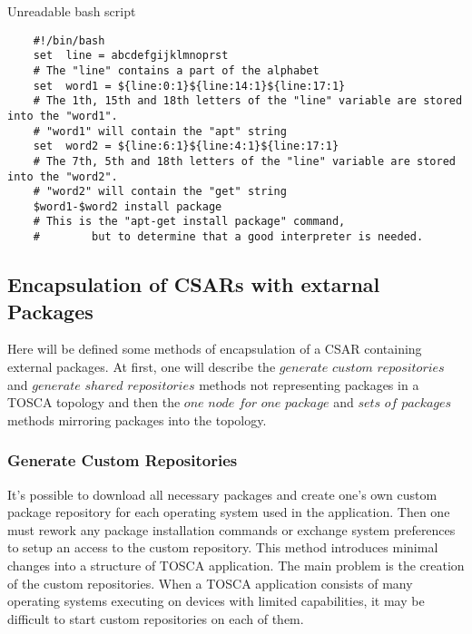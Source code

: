 \begin{Listing} 
	\caption{Unreadable bash script}
	\label{alg:unreadable}
	\begin{lstlisting}
	#!/bin/bash
	set  line = abcdefgijklmnoprst
	# The "line" contains a part of the alphabet
	set  word1 = ${line:0:1}${line:14:1}${line:17:1} 
	# The 1th, 15th and 18th letters of the "line" variable are stored into the "word1".
	# "word1" will contain the "apt" string 
	set  word2 = ${line:6:1}${line:4:1}${line:17:1}
	# The 7th, 5th and 18th letters of the "line" variable are stored into the "word2".
	# "word2" will contain the "get" string 
	$word1-$word2 install package
	# This is the "apt-get install package" command,
	#		 but to determine that a good interpreter is needed.
	\end{lstlisting}
\end{Listing}

\subsection*{Encapsulation of CSARs with extarnal Packages}\label{subs:encaps}
Here will be defined some methods of encapsulation of a CSAR containing external packages.
At first, one will describe the $generate$ $custom$ $repositories$ and $generate$ $shared$ $repositories$ methods not representing packages in a TOSCA topology and then the $one$ $node$ $for$ $one$ $package$ and $sets$ $of$ $packages$ methods mirroring packages into the topology.
\subsubsection*{Generate Custom Repositories}
It's possible to download all necessary packages and create one's own custom package repository for each operating system used in the application. 
Then one must rework any package installation commands or exchange system preferences to setup an access to the custom repository.
This method introduces minimal changes into a structure of TOSCA application.
The main problem is the creation of the custom repositories. 
When a TOSCA application consists of many operating systems executing on devices with limited capabilities, it may be difficult to start custom repositories on each of them.
